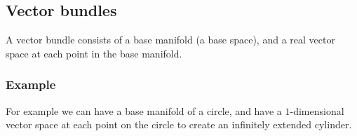 
\subsection{Vector bundles}

A vector bundle consists of a base manifold (a base space), and a real vector space at each point in the base manifold.

\subsubsection{Example}

For example we can have a base manifold of a circle, and have a \(1\)-dimensional vector space at each point on the circle to create an infinitely extended cylinder.


